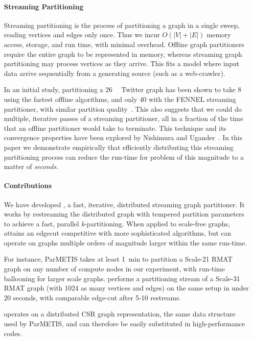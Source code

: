 \paragraph{Streaming Partitioning}
Streaming partitioning is the process of partitioning a graph in a single sweep, reading vertices and edges only once. Thus we incur $O(|V| + |E|)$ memory access, storage, and run time, with minimal overhead. Offline graph partitioners require the entire graph to be represented in memory, whereas streaming graph partitioning may process vertices as they arrive. This fits a model where input data arrive sequentially from a generating source (such as a web-crawler).

In an initial study, partitioning a \SI{26}{\giga\byte} Twitter graph has been shown to take \SI[abbreviations=false]{8}{\hours} using the fastest offline algorithms, and only \SI{40}{\minutes} with the FENNEL streaming partitioner, with similar partition quality~\cite{tsourakakis2012fennel}. This also suggests that we could do multiple, iterative passes of a streaming partitioner, all in a fraction of the time that an offline partitioner would take to terminate. This technique and its convergence properties have been explored by Nishimura and Ugander~\cite{nishimura2013restream}. In this paper we demonstrate empirically that efficiently distributing this streaming partitioning process can reduce the run-time for problem of this magnitude to a matter of \emph{seconds}. 

\paragraph{Contributions}
We have developed \ourmethod, a fast, iterative, distributed streaming graph partitioner.
It works by restreaming the distributed graph with tempered partition parameters to achieve a fast, parallel \textit{k}-partitioning. When applied to scale-free graphs, \ourmethod attains an edgecut competitive with more sophisticated algorithms, but can operate on graphs multiple orders of magnitude larger within the same run-time. 

For instance, ParMETIS takes at least \SI{1}{\minute} to partition a Scale-21 RMAT graph on any number of compute nodes in our experiment, with run-time ballooning for larger scale graphs. \ourmethod performs a partitioning stream of a Scale-31 RMAT graph (with 1024 as many vertices and edges) on the same setup in under 20 seconds, with comparable edge-cut after 5-10 restreams.

\ourmethod operates on a distributed CSR graph representation, the same data structure used by ParMETIS, and can therefore be easily substituted in high-performance codes. 

